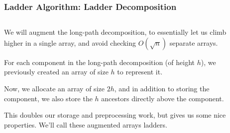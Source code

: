 \documentclass[aspectratio=169]{beamer}
\begin{document}
\begin{frame}
\frametitle{Ladder Algorithm: Ladder Decomposition}

\begin{columns}[onlytextwidth]
  \begin{column}{.58\textwidth}

    We will augment the long-path decomposition, to essentially let us climb
    higher in a single array, and avoid checking $O(\sqrt n)$ separate arrays.

    \vspace{1em}\pause
    For each component in the long-path decomposition (of height $h$), we
    previously created an array of size $h$ to represent it.

    \vspace{1em}\pause
    Now, we allocate an array of size $2h$, and in addition to storing the
    component, we also store the $h$ ancestors directly above the component.

    \vspace{1em}\pause
    This doubles our storage and preprocessing work, but gives us some nice
    properties.  We'll call these augmented arrays \alert{ladders}.

  \end{column}%
  \hfill%
  \begin{column}{.38\textwidth}


\end{column}
\end{columns}
\end{frame}
\end{document}
